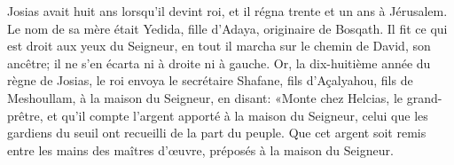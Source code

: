 Josias avait huit ans lorsqu’il devint roi,
	et il régna trente et un ans à Jérusalem.
Le nom de sa mère était Yedida, fille d’Adaya, originaire de Bosqath.
Il fit ce qui est droit aux yeux du Seigneur,
	en tout il marcha sur le chemin de David, son ancêtre;
	il ne s’en écarta ni à droite ni à gauche.
Or, la dix-huitième année du règne de Josias,
	le roi envoya le secrétaire Shafane, fils d’Açalyahou, fils de Meshoullam,
	à la maison du Seigneur, en disant:
	«Monte chez Helcias, le grand-prêtre,
	et qu’il compte l’argent apporté à la maison du Seigneur,
	celui que les gardiens du seuil ont recueilli de la part du peuple.
Que cet argent soit remis entre les mains des maîtres d’œuvre,
	préposés à la maison du Seigneur.
